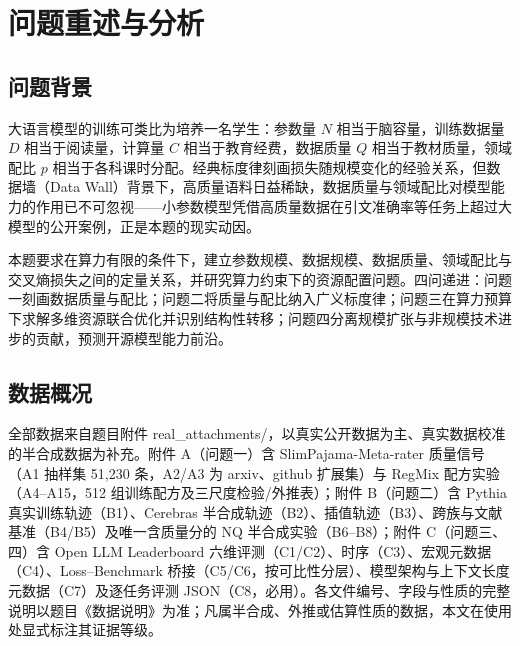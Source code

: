 \section{问题重述与分析}
\label{sec:intro}

\subsection{问题背景}
大语言模型的训练可类比为培养一名学生：参数量 $N$ 相当于脑容量，训练数据量 $D$ 相当于阅读量，计算量 $C$ 相当于教育经费，数据质量 $Q$ 相当于教材质量，领域配比 $p$ 相当于各科课时分配。经典标度律刻画损失随规模变化的经验关系，但数据墙（Data Wall）背景下，高质量语料日益稀缺，数据质量与领域配比对模型能力的作用已不可忽视——小参数模型凭借高质量数据在引文准确率等任务上超过大模型的公开案例，正是本题的现实动因。

本题要求在算力有限的条件下，建立参数规模、数据规模、数据质量、领域配比与交叉熵损失之间的定量关系，并研究算力约束下的资源配置问题。四问递进：问题一刻画数据质量与配比；问题二将质量与配比纳入广义标度律；问题三在算力预算下求解多维资源联合优化并识别结构性转移；问题四分离规模扩张与非规模技术进步的贡献，预测开源模型能力前沿。

\subsection{数据概况}
全部数据来自题目附件 real\_attachments/，以真实公开数据为主、真实数据校准的半合成数据为补充。附件 A（问题一）含 SlimPajama-Meta-rater 质量信号（A1 抽样集 51,230 条，A2/A3 为 arxiv、github 扩展集）与 RegMix 配方实验（A4--A15，512 组训练配方及三尺度检验/外推表）；附件 B（问题二）含 Pythia 真实训练轨迹（B1）、Cerebras 半合成轨迹（B2）、插值轨迹（B3）、跨族与文献基准（B4/B5）及唯一含质量分的 NQ 半合成实验（B6--B8）；附件 C（问题三、四）含 Open LLM Leaderboard 六维评测（C1/C2）、时序（C3）、宏观元数据（C4）、Loss--Benchmark 桥接（C5/C6，按可比性分层）、模型架构与上下文长度元数据（C7）及逐任务评测 JSON（C8，必用）。各文件编号、字段与性质的完整说明以题目《数据说明》为准；凡属半合成、外推或估算性质的数据，本文在使用处显式标注其证据等级。



